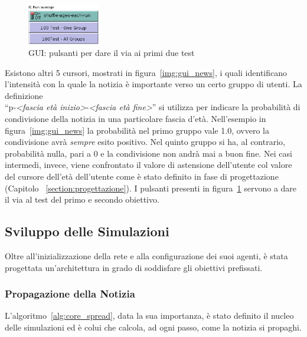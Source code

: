 \begin{figure}
  \vspace*{-40pt}
  \begin{center}
    \includegraphics[width=0.28\textwidth]{img/gui-first-second-test.png}
  \end{center}
 \vspace*{-10pt}
 \caption{GUI: 
 pulsanti per dare il via ai primi due test}
 \vspace*{-10pt}
 \label{img:gui_first_second_test}
\end{figure}
Esistono altri 5 cursori, mostrati in figura~\ref{img:gui_news}, i quali identificano l'intensità con la quale la notizia 
è importante verso un certo gruppo di utenti. 
La definizione\\
``p-\emph{<fascia età inizio>}-\emph{<fascia età fine>}'' si utilizza per indicare la probabilità di condivisione della notizia 
in una particolare fascia d'età.
Nell'esempio in figura~\ref{img:gui_news} la probabilità nel primo gruppo vale 1.0, ovvero la condivisione avrà \emph{sempre} esito positivo.
Nel quinto gruppo si ha, al contrario, probabilità nulla, pari a 0 e la condivisione non andrà mai a buon fine. 
Nei casi intermedi, invece, viene confrontato il valore di astensione dell'utente col valore del cursore dell'età dell'utente
come è stato definito in fase di progettazione (Capitolo ~\ref{section:progettazione}).
I pulsanti presenti in figura~\ref{img:gui_first_second_test} servono a dare il via al test del primo e secondo obiettivo.

\subsection{Sviluppo delle Simulazioni}
Oltre all'inizializzazione della rete e alla configurazione dei suoi agenti, è stata progettata un'architettura in grado di
soddisfare gli obiettivi prefissati.



\subsubsection{Propagazione della Notizia}
L'algoritmo~\ref{alg:core_spread}, data la sua importanza, è stato definito il nucleo delle simulazioni 
ed è colui che calcola, ad ogni passo, come la notizia si propaghi. 


